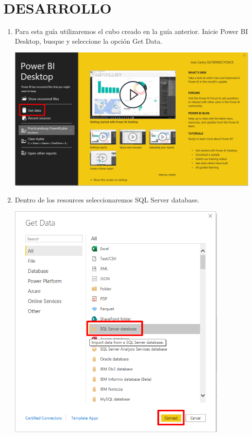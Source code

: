 \documentclass[12pt,letterpaper]{article}
\newcommand\tab[1][1cm]{\hspace*{#1}}
\begin{document}
    \section{DESARROLLO}
    \begin{enumerate}[\tab 1.]
        \item Para esta guía utilizaremos el cubo creado en la guía anterior. Inicie Power BI Desktop, busque y seleccione la opción Get Data.
        \begin{center}
            \includegraphics[width=13cm]{./img/img1.png}
        \end{center}
        \item Dentro de los resources seleccionaremos SQL Server database.
        \begin{center}
            \includegraphics[width=11cm]{./img/img2.png}

\end{center}
\end{enumerate}
\end{document}
